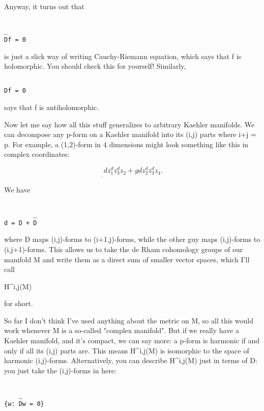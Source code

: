 Anyway, it turns out that 

\begin{verbatim}

_
Df = 0 
\end{verbatim}
    
is just a slick way of writing Cauchy-Riemann equation, which says that
f is holomorphic.  You should check this for yourself!  Similarly,


\begin{verbatim}

Df = 0 
\end{verbatim}
    
says that f is antiholomorphic.  

Now let me say how all this stuff generalizes to arbitrary Kaehler
manifolds.  We can decompose any p-form on a Kaehler manifold into
its (i,j) parts where i+j = p.  For example, a (1,2)-form
in 4 dimensions might look something like this in complex coordinates:

$$

    ^{ }    _ ^{ }   _     ^{  }        _ ^{ }   _
f dz_{1} ^ dz_{3} ^ dz_{2}  +  g dz_{2} ^ dz_{3} ^ dz_{4}.
$$
    
We have

\begin{verbatim}

        _
d = D + D
\end{verbatim}
    
where D maps (i,j)-forms to (i+1,j)-forms, while the other guy maps
(i,j)-forms to (i,j+1)-forms.  This allows us to take the de Rham
cohomology groups of our manifold M and write them as a direct sum of
smaller vector spaces, which I'll call

H^{i,j}(M) 

for short.  

So far I don't think I've used anything about the metric on M, so all
this would work whenever M is a so-called "complex manifold".
But if we really have a Kaehler manifold, and it's compact, we can say
more: a p-form is harmonic if and only if all its (i,j) parts are.  This
means H^{i,j}(M) is isomorphic to the space of harmonic
(i,j)-forms.  Alternatively, you can describe H^{i,j}(M) just
in terms of D: you just take the (i,j)-forms in here: 


\begin{verbatim}

    _
{w: Dw = 0}
\end{verbatim}
    

